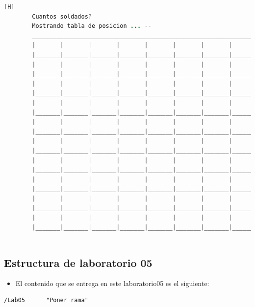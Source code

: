\documentclass{article}
\begin{document}
	\begin{lstlisting}[language=java,caption={Las lineas de codigos del metodo creado: \textcolor{red}{VER EL TEXTO EN LATEX EN LA IMAGEN SE DEFORMA O EJECUTARLO}}][H]
		Cuantos soldados? 
		Mostrando tabla de posicion ... -- 
		_________________________________________________________________________________
		|       |       |       |       |       |       |       |       |       |       |
		|_______|_______|_______|_______|_______|_______|_______|_______|_______|_______|
		|       |       |       |       |       |       |       |       |       |       |
		|_______|_______|_______|_______|_______|_______|_______|_______|_______|_______|
		|       |       |       |       |       |       |       |       |       |       |
		|_______|_______|_______|_______|_______|_______|_______|_______|_______|_______|
		|       |       |       |       |       |       |       |       |       |       |
		|_______|_______|_______|_______|_______|_______|_______|_______|_______|_______|
		|       |       |       |       |       |       |       |       |       |       |
		|_______|_______|_______|_______|_______|_______|_______|_______|_______|_______|
		|       |       |       |       |       |       |       |       |       |       |
		|_______|_______|_______|_______|_______|_______|_______|_______|_______|_______|
		|       |       |       |       |       |       |       |       |       |       |
		|_______|_______|_______|_______|_______|_______|_______|_______|_______|_______|
		|       |       |       |       |       |       |       |       |       |       |
		|_______|_______|_______|_______|_______|_______|_______|_______|_______|_______|
		|       |       |       |       |       |       |       |       |       |       |
		|_______|_______|_______|_______|_______|_______|_______|_______|_______|_______|
		|       |       |       |       |       |       |       |       |       |       |
		|_______|_______|_______|_______|_______|_______|_______|_______|_______|_______|
		
	\end{lstlisting}
	
	\subsection{Estructura de laboratorio 05}
	\begin{itemize}	
		\item El contenido que se entrega en este laboratorio05 es el siguiente:
	\end{itemize}
	\begin{lstlisting}[style=ascii-tree]
	/Lab05 		"Poner rama"

	\end{lstlisting}    
\end{document}
